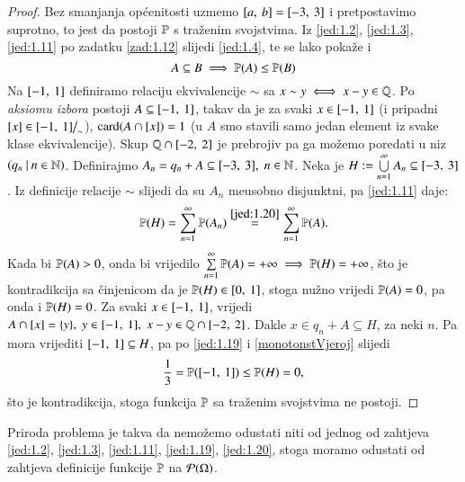 \begin{proof}
    Bez smanjanja op\' cenitosti uzmemo $[{a}, \:{b}] = [{-3}, \:{3}]$ i pretpostavimo suprotno, to jest da postoji $\mathbb{P}$ s tra\v zenim svojstvima.
    Iz \eqref{jed:1.2}, \eqref{jed:1.3}, \eqref{jed:1.11} po zadatku \ref{zad:1.12} slijedi \eqref{jed:1.4}, te se lako poka\v ze i
    \begin{equation} \label{monotonstVjeroj}
        A \subseteq B \implies \mathbb{P}({A}) \leq \mathbb{P}({B})
    \end{equation}
    Na $[{-1}, \:{1}]$ definiramo relaciju ekvivalencije $\sim$ sa $x \sim y \iff x - y \in \mathbb{Q}$.
    Po \emph{aksiomu izbora} postoji $A \subseteq [{-1}, \:{1}]$, takav da je za svaki $x \in [{-1}, \:{1}]$ (i pripadni $[x] \in [{-1}, \:{1}] \big/_{\sim}$), $\textnormal{card}({A \cap [x]}) = 1$ (u $A$ smo stavili samo jedan element iz svake klase ekvivalencije).
    Skup $\mathbb{Q} \cap [{-2}, \:{2}]$ je prebrojiv pa ga mo\v zemo poredati u niz $({q_n} \: | \: {n \in \mathbb{N}})$. 
    Definirajmo $A_n = q_n + A \subseteq [{-3}, \:{3}], \; n \in
    \mathbb{N}$.
    Neka je $H := \bigcup\limits_{n=1}^{\infty} A_n \subseteq [{-3}, \:{3}]$. 
    Iz definicije relacije $\sim$ slijedi da su $A_n$ me\dj usobno disjunktni, pa \eqref{jed:1.11} daje:
    \begin{equation*}
        \mathbb{P}({H}) = \sum\limits_{n=1}^{\infty} \mathbb{P}({A_n})
            \overset{\eqref{jed:1.20}}{=} \sum\limits_{n=1}^{\infty}
            \mathbb{P}({A}).
    \end{equation*}
    Kada bi $\mathbb{P}({A}) > 0$, onda bi vrijedilo $\sum\limits_{n=1}^{\infty} \mathbb{P}({A}) = + \infty \implies \mathbb{P}({H}) = +\infty$, \v sto je kontradikcija sa \v cinjenicom da je $\mathbb{P}({H}) \in [{0}, \:{1}]$, stoga nu\v zno vrijedi $\mathbb{P}({A}) = 0$, pa onda i $\mathbb{P}({H}) = 0$.
    Za svaki $x \in [{-1}, \:{1}]$, vrijedi $A \cap [x] = \{y\}, \; y \in [{-1}, \:{1}], \; x - y \in \mathbb{Q} \cap [{-2}, \:{2}]$.
    Dakle $x \in q_n + A \subseteq H$, za neki $n$.
    Pa mora vrijediti $[{-1}, \:{1}] \subseteq H$, pa po \eqref{jed:1.19} i \eqref{monotonstVjeroj} slijedi
    \begin{equation*}
        \frac{1}{3} = \mathbb{P}({[{-1}, \:{1}]}) \leq \mathbb{P}({H}) = 0,
    \end{equation*}
    \v sto je kontradikcija, stoga funkcija $\mathbb{P}$ sa tra\v zenim svojstvima ne postoji.
\end{proof}

Priroda problema je takva da nemo\v zemo odustati niti od jednog od zahtjeva \eqref{jed:1.2}, \eqref{jed:1.3}, \eqref{jed:1.11}, \eqref{jed:1.19}, \eqref{jed:1.20}, stoga moramo odustati od zahtjeva definicije funkcije $\mathbb{P}$ na $\mathcal{P}({\Omega})$.

